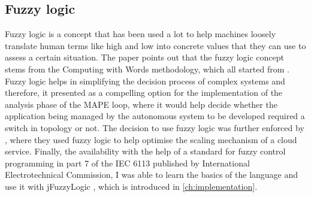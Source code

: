 \subsection{Fuzzy logic}
Fuzzy logic is a concept that has been used a lot to help machines loosely translate human terms like high and low into concrete values that they can use to assess a certain situation. The paper \cite{zadeh1996fuzzy} points out that  the fuzzy logic concept stems from the Computing with Words methodology, which all started from \cite{zadeh1973outline}. Fuzzy logic helps in simplifying the decision process of complex systems and therefore, it presented as a compelling option for the implementation of the analysis phase of the MAPE loop, where it would help decide whether the application being managed by the autonomous system to be developed required a switch in topology or not. The decision to use fuzzy logic was further enforced by \cite{frey2014cloud}, where they used fuzzy logic to help optimise the scaling mechanism of a cloud service. Finally, the availability with the help of a standard for fuzzy control programming in part 7 of the IEC 6113 published by International Electrotechnical Commission, I was able to learn the basics of the language and use it with jFuzzyLogic \cite{cingolani2013jfuzzylogic}, which is introduced in \autoref{ch:implementation}.  

